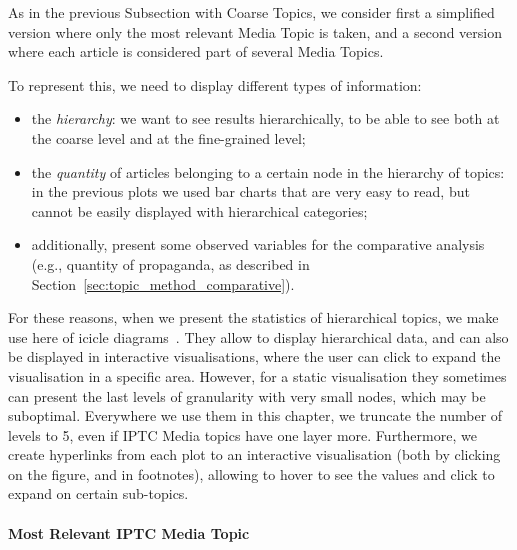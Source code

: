 






As in the previous Subsection with Coarse Topics, we consider first a simplified version where only the most relevant Media Topic is taken, and a second version where each article is considered part of several Media Topics.

To represent this, we need to display different types of information:

\begin{itemize}
    \item the \emph{hierarchy}: we want to see results hierarchically, to be able to see both at the coarse level and at the fine-grained level;
    \item the \emph{quantity} of articles belonging to a certain node in the hierarchy of topics: in the previous plots we used bar charts that are very easy to read, but cannot be easily displayed with hierarchical categories;
    \item additionally, present some observed variables for the comparative analysis (e.g., quantity of propaganda, as described in Section~\ref{sec:topic_method_comparative}).
\end{itemize}

For these reasons, when we present the statistics of hierarchical topics, we make use here of icicle diagrams~\cite{kruskal1983icicle}.
They allow to display hierarchical data, and can also be displayed in interactive visualisations, where the user can click to expand the visualisation in a specific area.
However, for a static visualisation they sometimes can present the last levels of granularity with very small nodes, which may be suboptimal.
Everywhere we use them in this chapter, we truncate the number of levels to 5, even if IPTC Media topics have one layer more.
Furthermore, we create hyperlinks from each plot to an interactive visualisation (both by clicking on the figure, and in footnotes), allowing to hover to see the values and click to expand on certain sub-topics.

\paragraph{Most Relevant IPTC Media Topic}

